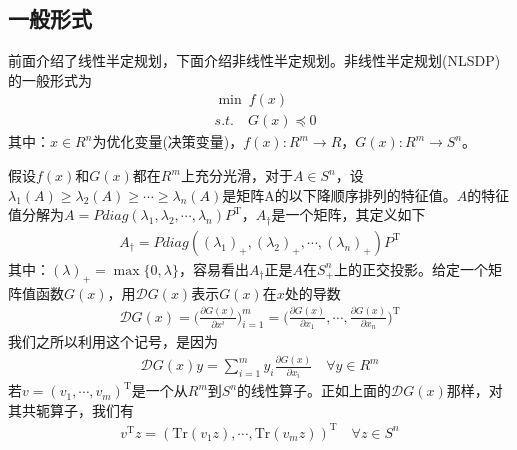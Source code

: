     \subsection{一般形式}
        \par
        前面介绍了线性半定规划，下面介绍非线性半定规划。非线性半定规划(NLSDP)的一般形式为
        \begin{align*}
          & \mathop{\min} \  f(x)\\
          & s.t.\quad G(x) \preceq 0
        \end{align*}
        其中：$x \in R^n$为优化变量(决策变量)，$f(x):R^m \to R$，$G(x):R^m \to S^n$。
        \par
        假设$f(x)$和$G(x)$都在$R^m$上充分光滑，对于$A\in S^n$，设${\lambda}_1(A)\geqslant {\lambda}_2(A)\geqslant \cdots \geqslant {\lambda}_n(A)$是矩阵A的以下降顺序排列的特征值。$A$的特征值分解为$A=P diag({\lambda}_1,{\lambda}_2,\cdots,{\lambda}_n)P^\mathrm{T} $，$A_{\dag}$是一个矩阵，其定义如下
        \begin{align*}
          A_{\dag}=Pdiag(({\lambda}_1)_+,({\lambda}_2)_+,\cdots,({\lambda}_n)_+)P^\mathrm{T}
        \end{align*}
        其中：$(\lambda)_+=\max\{0,\lambda\}$，容易看出$A_{\dag}$正是$A$在$S_{+}^n$上的正交投影。给定一个矩阵值函数$G(x)$，用$\mathcal{D}G(x)$表示$G(x)$在$x$处的导数
        \begin{align*}
          \mathcal{D}G(x)=\bigg(\frac{\partial G(x)}{\partial x^i}\bigg)_{i=1}^m=\bigg(\frac{\partial G(x)}{\partial x_1},\cdots,\frac{\partial G(x)}{\partial x_n}\bigg)^\mathrm{T}
        \end{align*}
        我们之所以利用这个记号，是因为
        \begin{align*}
          \mathcal{D}G(x)y=\mathop {\sum}\limits_{i=1}^m y_i\frac{\partial G(x)}{\partial x_i}\quad \forall y \in R^m
        \end{align*}
        若$v=(v_1,\cdots,v_m)^\mathrm{T} $是一个从$R^m$到$S^n$的线性算子。正如上面的$\mathcal{D}G(x)$那样，对其共轭算子，我们有
        \begin{align*}
          v^\mathrm{T} z=(\mathrm{Tr}(v_1z),\cdots,\mathrm{Tr}(v_mz))^\mathrm{T} \quad \forall z \in S^n
        \end{align*}
